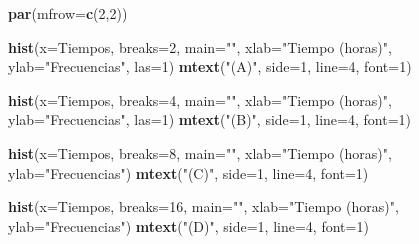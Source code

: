 \documentclass[10pt,]{krantz}
\makeatletter
\newenvironment{Shaded}{\begin{snugshade}}{\end{snugshade}}
\newcommand{\KeywordTok}[1]{\textcolor[rgb]{0.13,0.29,0.53}{\textbf{#1}}}
\newcommand{\DataTypeTok}[1]{\textcolor[rgb]{0.13,0.29,0.53}{#1}}
\newcommand{\DecValTok}[1]{\textcolor[rgb]{0.00,0.00,0.81}{#1}}
\newcommand{\StringTok}[1]{\textcolor[rgb]{0.31,0.60,0.02}{#1}}
\newcommand{\NormalTok}[1]{#1}
\newenvironment{kframe}{%
\medskip{}
\setlength{\fboxsep}{.8em}
 \def\at@end@of@kframe{}%
 \ifinner\ifhmode%
  \def\at@end@of@kframe{\end{minipage}}%
  \begin{minipage}{\columnwidth}%
 \fi\fi%
 \def\FrameCommand##1{\hskip\@totalleftmargin \hskip-\fboxsep
 \colorbox{shadecolor}{##1}\hskip-\fboxsep
     \hskip-\linewidth \hskip-\@totalleftmargin \hskip\columnwidth}%
 \MakeFramed {\advance\hsize-\width
   \@totalleftmargin\z@ \linewidth\hsize
   \@setminipage}}%
 {\par\unskip\endMakeFramed%
 \at@end@of@kframe}
\renewenvironment{Shaded}{\begin{kframe}}{\end{kframe}}
\makeatother
\begin{document}
\begin{Shaded}
\begin{Highlighting}[]
\KeywordTok{par}\NormalTok{(}\DataTypeTok{mfrow=}\KeywordTok{c}\NormalTok{(}\DecValTok{2}\NormalTok{,}\DecValTok{2}\NormalTok{))}

\KeywordTok{hist}\NormalTok{(}\DataTypeTok{x=}\NormalTok{Tiempos, }\DataTypeTok{breaks=}\DecValTok{2}\NormalTok{, }\DataTypeTok{main=}\StringTok{""}\NormalTok{, }\DataTypeTok{xlab=}\StringTok{"Tiempo (horas)"}\NormalTok{,}
     \DataTypeTok{ylab=}\StringTok{"Frecuencias"}\NormalTok{, }\DataTypeTok{las=}\DecValTok{1}\NormalTok{)}
\KeywordTok{mtext}\NormalTok{(}\StringTok{"(A)"}\NormalTok{, }\DataTypeTok{side=}\DecValTok{1}\NormalTok{, }\DataTypeTok{line=}\DecValTok{4}\NormalTok{, }\DataTypeTok{font=}\DecValTok{1}\NormalTok{)}

\KeywordTok{hist}\NormalTok{(}\DataTypeTok{x=}\NormalTok{Tiempos, }\DataTypeTok{breaks=}\DecValTok{4}\NormalTok{, }\DataTypeTok{main=}\StringTok{""}\NormalTok{, }\DataTypeTok{xlab=}\StringTok{"Tiempo (horas)"}\NormalTok{,}
     \DataTypeTok{ylab=}\StringTok{"Frecuencias"}\NormalTok{, }\DataTypeTok{las=}\DecValTok{1}\NormalTok{)}
\KeywordTok{mtext}\NormalTok{(}\StringTok{"(B)"}\NormalTok{, }\DataTypeTok{side=}\DecValTok{1}\NormalTok{, }\DataTypeTok{line=}\DecValTok{4}\NormalTok{, }\DataTypeTok{font=}\DecValTok{1}\NormalTok{)}

\KeywordTok{hist}\NormalTok{(}\DataTypeTok{x=}\NormalTok{Tiempos, }\DataTypeTok{breaks=}\DecValTok{8}\NormalTok{, }\DataTypeTok{main=}\StringTok{""}\NormalTok{, }\DataTypeTok{xlab=}\StringTok{"Tiempo (horas)"}\NormalTok{,}
     \DataTypeTok{ylab=}\StringTok{"Frecuencias"}\NormalTok{)}
\KeywordTok{mtext}\NormalTok{(}\StringTok{"(C)"}\NormalTok{, }\DataTypeTok{side=}\DecValTok{1}\NormalTok{, }\DataTypeTok{line=}\DecValTok{4}\NormalTok{, }\DataTypeTok{font=}\DecValTok{1}\NormalTok{)}

\KeywordTok{hist}\NormalTok{(}\DataTypeTok{x=}\NormalTok{Tiempos, }\DataTypeTok{breaks=}\DecValTok{16}\NormalTok{, }\DataTypeTok{main=}\StringTok{""}\NormalTok{, }\DataTypeTok{xlab=}\StringTok{"Tiempo (horas)"}\NormalTok{,}
     \DataTypeTok{ylab=}\StringTok{"Frecuencias"}\NormalTok{)}
\KeywordTok{mtext}\NormalTok{(}\StringTok{"(D)"}\NormalTok{, }\DataTypeTok{side=}\DecValTok{1}\NormalTok{, }\DataTypeTok{line=}\DecValTok{4}\NormalTok{, }\DataTypeTok{font=}\DecValTok{1}\NormalTok{)}
\end{Highlighting}
\end{Shaded}
\end{document}
